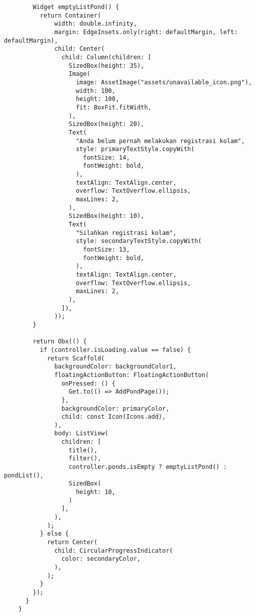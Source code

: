 \begin{lstlisting}
		Widget emptyListPond() {
		  return Container(
			  width: double.infinity,
			  margin: EdgeInsets.only(right: defaultMargin, left: defaultMargin),
			  child: Center(
				child: Column(children: [
				  SizedBox(height: 35),
				  Image(
					image: AssetImage("assets/unavailable_icon.png"),
					width: 100,
					height: 100,
					fit: BoxFit.fitWidth,
				  ),
				  SizedBox(height: 20),
				  Text(
					"Anda belum pernah melakukan registrasi kolam",
					style: primaryTextStyle.copyWith(
					  fontSize: 14,
					  fontWeight: bold,
					),
					textAlign: TextAlign.center,
					overflow: TextOverflow.ellipsis,
					maxLines: 2,
				  ),
				  SizedBox(height: 10),
				  Text(
					"Silahkan registrasi kolam",
					style: secondaryTextStyle.copyWith(
					  fontSize: 13,
					  fontWeight: bold,
					),
					textAlign: TextAlign.center,
					overflow: TextOverflow.ellipsis,
					maxLines: 2,
				  ),
				]),
			  ));
		}
	
		return Obx(() {
		  if (controller.isLoading.value == false) {
			return Scaffold(
			  backgroundColor: backgroundColor1,
			  floatingActionButton: FloatingActionButton(
				onPressed: () {
				  Get.to(() => AddPondPage());
				},
				backgroundColor: primaryColor,
				child: const Icon(Icons.add),
			  ),
			  body: ListView(
				children: [
				  title(),
				  filter(),
				  controller.ponds.isEmpty ? emptyListPond() : pondList(),
				  SizedBox(
					height: 10,
				  )
				],
			  ),
			);
		  } else {
			return Center(
			  child: CircularProgressIndicator(
				color: secondaryColor,
			  ),
			);
		  }
		});
	  }
	}
		\end{lstlisting}


